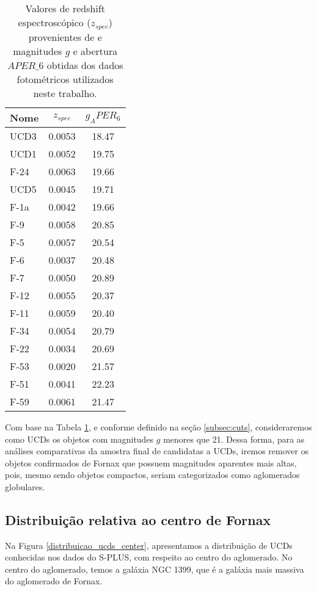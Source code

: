 \begin{table}[!ht]
    \centering
    \caption{Valores de redshift espectroscópico ($z_{spec}$) provenientes de \cite{Lima_2024} e magnitudes $g$ e abertura $APER\_6$ obtidas dos dados fotométricos utilizados neste trabalho.}
    \begin{tabular}{lcc}
        \toprule
        Nome & $z_{spec}$ & $g_APER_6$ \\
        \midrule
        UCD3 & 0.0053 & 18.47\\
        UCD1 & 0.0052 & 19.75\\
        F-24 & 0.0063 & 19.66\\
        UCD5 & 0.0045 & 19.71\\
        F-1a & 0.0042 & 19.66\\
        F-9  & 0.0058 & 20.85\\
        F-5  & 0.0057 & 20.54\\
        F-6  & 0.0037 & 20.48\\
        F-7  & 0.0050 & 20.89\\
        F-12 & 0.0055 & 20.37\\
        F-11 & 0.0059 & 20.40\\
        F-34 & 0.0054 & 20.79\\
        F-22 & 0.0034 & 20.69\\
        F-53 & 0.0020 & 21.57\\
        F-51 & 0.0041 & 22.23\\
        F-59 & 0.0061 & 21.47\\
        \bottomrule
    \end{tabular}
    \label{tab:ucds_know_z_gmag}
\end{table}

Com base na Tabela \ref{tab:ucds_know_z_gmag}, e conforme definido na seção \ref{subsec:cuts}, consideraremos como UCDs os objetos com magnitudes $g$ menores que 21. Dessa forma, para as análises comparativas da amostra final de candidatas a UCDs, iremos remover os objetos confirmados de Fornax que possuem magnitudes aparentes mais altas, pois, mesmo sendo objetos compactos, seriam categorizados como aglomerados globulares.

\subsection{Distribuição relativa ao centro de Fornax}
Na Figura \ref{distribuicao_ucds_center}, apresentamos a distribuição de UCDs conhecidas nos dados do S-PLUS, com respeito ao centro do aglomerado. No centro do aglomerado, temos a galáxia NGC 1399, que é a galáxia mais massiva do aglomerado de Fornax.

